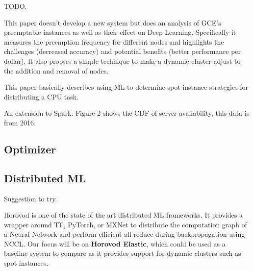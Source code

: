 TODO.


\noindent \tagdynamic{} \tagdataparallelism{}
This paper doesn't develop a new system but does an analysis of GCE's
preemptable instances as well as their effect on Deep Learning.
Specifically it measures the preemption frequency for different nodes and
highlights the challenges (decreased accuracy) and potential benefits
(better performance per dollar).
It also propses a simple technique to make a dynamic cluster adjust to the
addition and removal of nodes.


This paper basically describes using ML to determine spot instance strategies
for distributing a CPU task.


An extension to Spark.
Figure 2 shows the CDF of server availability, this data is from 2016.

\subsection{Optimizer}


\noindent \tagoptimizer{}


\subsection{Distributed ML}


Suggestion to try.


\noindent \tagdynamic{} \tagdataparallelism{} \tagtransient{}
Horovod is one of the state of the art distributed ML frameworks.
It provides a wrapper around TF, PyTorch, or MXNet to distribute the
computation graph of a Neural Network and perform efficient all-reduce during
backpropagation using NCCL.
Our focus will be on \textbf{Horovod Elastic}, which could be used as a baseline system
to compare as it provides support for dynamic clusters such as spot instances.


